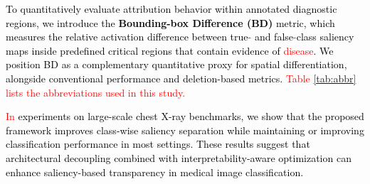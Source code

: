 \documentclass[preprint,7pt, a4paper]{elsarticle}
\begin{document}
\textcolor{black}{To quantitatively evaluate attribution behavior within annotated diagnostic regions, we introduce the \textbf{Bounding-box Difference (BD)} metric, which measures the relative activation difference between true\textcolor{red}{-} and false\textcolor{red}{-}class saliency maps inside predefined critical regions that contain evidence of \textcolor{red}{disease}. We position BD as a complementary quantitative proxy for spatial differentiation, alongside conventional performance and deletion-based metrics. \textcolor{red}{Table \ref{tab:abbr} lists the abbreviations used in this study.}}

\textcolor{black}{\textcolor{red}{In} experiments on large-scale chest X-ray benchmarks, we show that the proposed framework improves class-wise saliency separation while maintaining or improving classification performance in most settings. These results suggest that architectural decoupling combined with interpretability-aware optimization can enhance saliency-based transparency in medical image classification.}



\end{document}
